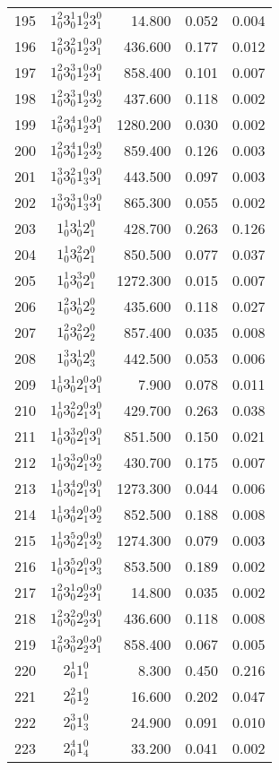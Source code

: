 \documentclass[12pt]{article}
\begin{document}
\begin{table}
\begin{tabular}{rcrrr}
195&$1_0^2 3_0^1 1_2^0 3_1^0$& 14.800& 0.052& 0.004\\
196&$1_0^2 3_0^2 1_2^0 3_1^0$& 436.600& 0.177& 0.012\\
197&$1_0^2 3_0^3 1_2^0 3_1^0$& 858.400& 0.101& 0.007\\
198&$1_0^2 3_0^3 1_2^0 3_2^0$& 437.600& 0.118& 0.002\\
199&$1_0^2 3_0^4 1_2^0 3_1^0$& 1280.200& 0.030& 0.002\\
200&$1_0^2 3_0^4 1_2^0 3_2^0$& 859.400& 0.126& 0.003\\
201&$1_0^3 3_0^2 1_3^0 3_1^0$& 443.500& 0.097& 0.003\\
202&$1_0^3 3_0^3 1_3^0 3_1^0$& 865.300& 0.055& 0.002\\
203&$1_0^1 3_0^1 2_1^0$& 428.700& 0.263& 0.126\\
204&$1_0^1 3_0^2 2_1^0$& 850.500& 0.077& 0.037\\
205&$1_0^1 3_0^3 2_1^0$& 1272.300& 0.015& 0.007\\
206&$1_0^2 3_0^1 2_2^0$& 435.600& 0.118& 0.027\\
207&$1_0^2 3_0^2 2_2^0$& 857.400& 0.035& 0.008\\
208&$1_0^3 3_0^1 2_3^0$& 442.500& 0.053& 0.006\\
209&$1_0^1 3_0^1 2_1^0 3_1^0$& 7.900& 0.078& 0.011\\
210&$1_0^1 3_0^2 2_1^0 3_1^0$& 429.700& 0.263& 0.038\\
211&$1_0^1 3_0^3 2_1^0 3_1^0$& 851.500& 0.150& 0.021\\
212&$1_0^1 3_0^3 2_1^0 3_2^0$& 430.700& 0.175& 0.007\\
213&$1_0^1 3_0^4 2_1^0 3_1^0$& 1273.300& 0.044& 0.006\\
214&$1_0^1 3_0^4 2_1^0 3_2^0$& 852.500& 0.188& 0.008\\
215&$1_0^1 3_0^5 2_1^0 3_2^0$& 1274.300& 0.079& 0.003\\
216&$1_0^1 3_0^5 2_1^0 3_3^0$& 853.500& 0.189& 0.002\\
217&$1_0^2 3_0^1 2_2^0 3_1^0$& 14.800& 0.035& 0.002\\
218&$1_0^2 3_0^2 2_2^0 3_1^0$& 436.600& 0.118& 0.008\\
219&$1_0^2 3_0^3 2_2^0 3_1^0$& 858.400& 0.067& 0.005\\
220&$2_0^1 1_1^0$& 8.300& 0.450& 0.216\\
221&$2_0^2 1_2^0$& 16.600& 0.202& 0.047\\
222&$2_0^3 1_3^0$& 24.900& 0.091& 0.010\\
223&$2_0^4 1_4^0$& 33.200& 0.041& 0.002\\

\end{tabular}
\end{table}
\end{document}
